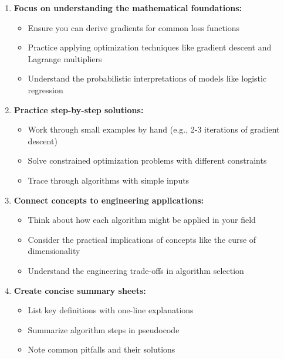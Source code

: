 \documentclass[12pt]{article}
\begin{document}
\begin{tcolorbox}[title=Final Study Recommendations, colback=yellow!5, colframe=yellow!50!black]
\begin{enumerate}
    \item \textbf{Focus on understanding the mathematical foundations:}
    \begin{itemize}
        \item Ensure you can derive gradients for common loss functions
        \item Practice applying optimization techniques like gradient descent and Lagrange multipliers
        \item Understand the probabilistic interpretations of models like logistic regression
    \end{itemize}
    
    \item \textbf{Practice step-by-step solutions:}
    \begin{itemize}
        \item Work through small examples by hand (e.g., 2-3 iterations of gradient descent)
        \item Solve constrained optimization problems with different constraints
        \item Trace through algorithms with simple inputs
    \end{itemize}
    
    \item \textbf{Connect concepts to engineering applications:}
    \begin{itemize}
        \item Think about how each algorithm might be applied in your field
        \item Consider the practical implications of concepts like the curse of dimensionality
        \item Understand the engineering trade-offs in algorithm selection
    \end{itemize}
    
    \item \textbf{Create concise summary sheets:}
    \begin{itemize}
        \item List key definitions with one-line explanations
        \item Summarize algorithm steps in pseudocode
        \item Note common pitfalls and their solutions
    \end{itemize}
\end{enumerate}
\end{tcolorbox}
\end{document}
